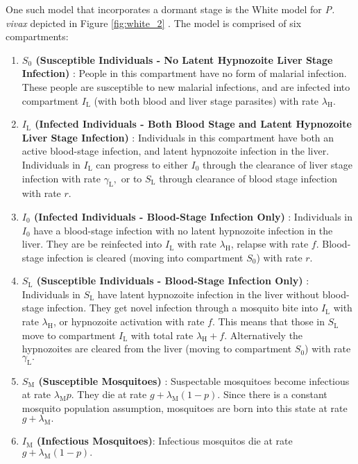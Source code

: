 One such model that incorporates a dormant stage is the White model 
for \textit{P. vivax} depicted in
Figure \ref{fig:white_2} \parencite[Tropical Model]{white_variation_2016}. 
The model is comprised of six compartments: \begin{enumerate}
    \item \textbf{
              $S_0$ (Susceptible Individuals - No Latent Hypnozoite Liver
              Stage Infection)
          }: People in this compartment have no form of malarial infection.
          These people are susceptible to new malarial infections,
          and are infected into compartment $I_\mathrm{L}$ (with both blood
          and liver stage parasites) with rate $\lambda_\mathrm{H}$.
    \item \textbf{
              $I_\mathrm{L}$ (Infected Individuals - Both Blood Stage and Latent
              Hypnozoite Liver Stage Infection)
          }:  Individuals in this compartment have both an active blood-stage
          infection, and latent hypnozoite infection in the liver. 
          Individuals in $I_\mathrm{L}$ can
          progress to either $I_0$ through the clearance of liver stage
          infection with rate $\gamma_\mathrm{L},$ or to $S_\mathrm{L}$ through
          clearance of blood stage infection with rate $r$.
    \item \textbf{
              $I_0$ (Infected Individuals - Blood-Stage Infection Only)
          }: Individuals in $I_0$ have a blood-stage infection with no
          latent hypnozoite infection in the liver. They are be reinfected into
          $I_\mathrm{L}$ with rate $\lambda_\mathrm{H}$, relapse with rate $f$.
          Blood-stage infection is cleared (moving into compartment $S_0$) with
          rate $r$.
    \item \textbf{
              $S_\mathrm{L}$ (Susceptible Individuals -
              Blood-Stage Infection Only)
          }: Individuals in $S_\mathrm{L}$ have latent hypnozoite infection in
          the liver without blood-stage infection. They get novel infection
          through a mosquito bite into $I_\mathrm{L}$ with rate
          $\lambda_\mathrm{H}$, or hypnozoite activation with rate $f$.
          This means that those in $S_\mathrm{L}$ move to compartment
          $I_\mathrm{L}$ with total rate $\lambda_\mathrm{H} + f.$
          Alternatively the hypnozoites are cleared from the liver
          (moving to compartment $S_0$) with rate $\gamma_\mathrm{L}.$
    \item \textbf{
              $S_\mathrm{M}$ (Susceptible Mosquitoes)
          }:
          Suspectable mosquitoes become infectious at rate
          $\lambda_\mathrm{M}p.$ They die at rate
          $g + \lambda_\mathrm{M}(1 - p).$ Since there is a constant mosquito
          population assumption, mosquitoes are born into this state at rate
          $g + \lambda_\mathrm{M}.$
    \item \textbf{$I_\mathrm{M}$ (Infectious Mosquitoes)}:
          Infectious mosquitos die at rate $g + \lambda_\mathrm{M}(1 - p).$
\end{enumerate}

